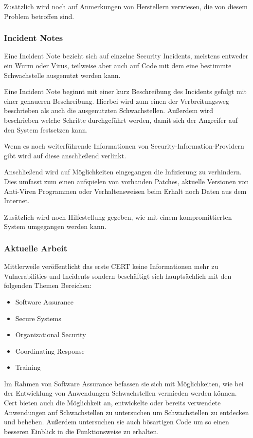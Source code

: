 Zusätzlich wird noch auf Anmerkungen von Herstellern verwiesen, die
von diesem Problem betroffen sind.

\subsubsection{Incident Notes} Eine Incident Note bezieht sich auf
einzelne Security Incidents, meistens entweder ein Wurm oder Virus,
teilweise aber auch auf Code mit dem eine bestimmte Schwachstelle
ausgenutzt werden kann.

Eine Incident Note beginnt mit einer kurz Beschreibung des Incidents
gefolgt mit einer genaueren Beschreibung. Hierbei wird zum einen der
Verbreitungsweg beschrieben als auch die ausgenutzten
Schwachstellen. Außerdem wird beschrieben welche Schritte durchgeführt
werden, damit sich der Angreifer auf den System festsetzen kann.

Wenn es noch weiterführende Informationen von
Security-Information-Providern gibt wird auf diese anschließend
verlinkt.

Anschließend wird auf Möglichkeiten eingegangen die Infizierung zu
verhindern.  Dies umfasst zum einen aufspielen von vorhanden Patches,
aktuelle Versionen von Anti-Viren Programmen oder Verhaltensweisen
beim Erhalt noch Daten aus dem Internet.

Zusätzlich wird noch Hilfestellung gegeben, wie mit einem
kompromittierten System umgegangen werden kann.
\subsubsection{Aktuelle Arbeit} Mittlerweile veröffentlicht das erste
CERT keine Informationen mehr zu Vulnerabilities und Incidents sondern
beschäftigt sich hauptsächlich mit den folgenden Themen Bereichen:
\begin{itemize}
 \item Software Assurance
 \item Secure Systems
 \item Organizational Security
 \item Coordinating Response
 \item Training
\end{itemize}

Im Rahmen von Software Assurance befassen sie sich mit Möglichkeiten,
wie bei der Entwicklung von Anwendungen Schwachstellen vermieden
werden können. Cert bieten auch die Möglichkeit an, entwickelte oder
bereits verwendete Anwendungen auf Schwachstellen zu untersuchen um
Schwachstellen zu entdecken und beheben. Außerdem untersuchen sie auch
bösartigen Code um so einen besseren Einblick in die Funktionsweise zu
erhalten.


